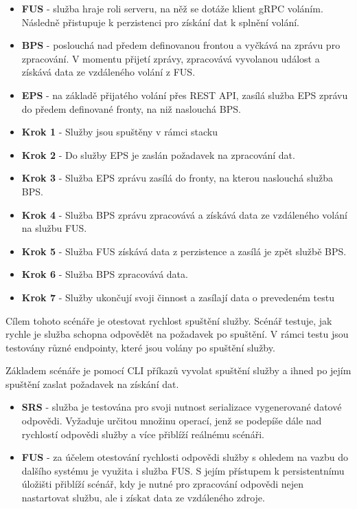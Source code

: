 \begin{itemize}
    \item \textbf{FUS} - služba hraje roli serveru, na něž se dotáže klient gRPC voláním. Následně přistupuje k perzistenci pro získání dat k splnění volání.
    \item \textbf{BPS} - poslouchá nad předem definovanou frontou a vyčkává na zprávu pro zpracování. V momentu přijetí zprávy, zpracovává vyvolanou událost a získává data ze vzdáleného volání z FUS.
    \item \textbf{EPS} - na základě přijatého volání přes REST API, zasílá služba EPS zprávu do předem definované fronty, na niž naslouchá BPS.
\end{itemize}


\begin{itemize}
    \item \textbf{Krok 1} - Služby jsou spuštěny v rámci stacku
    \item \textbf{Krok 2} - Do služby EPS je zaslán požadavek na zpracování dat. 
    \item \textbf{Krok 3} - Služba EPS zprávu zasílá do fronty, na kterou naslouchá služba BPS. 
    \item \textbf{Krok 4} - Služba BPS zprávu zpracovává a získává data ze vzdáleného volání na službu FUS. 
    \item \textbf{Krok 5} - Služba FUS získává data z perzistence a zasílá je zpět službě BPS. 
    \item \textbf{Krok 6} - Služba BPS zpracovává data.
    \item \textbf{Krok 7} - Služby ukončují svoji činnost a zasílají data o prevedeném testu
\end{itemize}


Cílem tohoto scénáře je otestovat rychlost spuštění služby. Scénář testuje, jak rychle je služba schopna odpovědět na požadavek po spuštění. V rámci testu jsou testovány různé endpointy, které jsou volány po spuštění služby.

Základem scénáře je pomocí CLI příkazů vyvolat spuštění služby a ihned po jejím spuštění zaslat požadavek na získání dat.



\begin{itemize}
    \item \textbf{SRS} - služba je testována pro svoji nutnost serializace vygenerované datové odpovědi. Vyžaduje určitou množinu operací, jenž se podepíše dále nad rychlostí odpovědi služby a více přiblíží reálnému scénáři.
    \item \textbf{FUS} - za účelem otestování rychlosti odpovědi služby s ohledem na vazbu do dalšího systému je využita i služba FUS. S jejím přístupem k persistentnímu úložišti přiblíží scénář, kdy je nutné pro zpracování odpovědi nejen nastartovat službu, ale i získat data ze vzdáleného zdroje.
\end{itemize}

